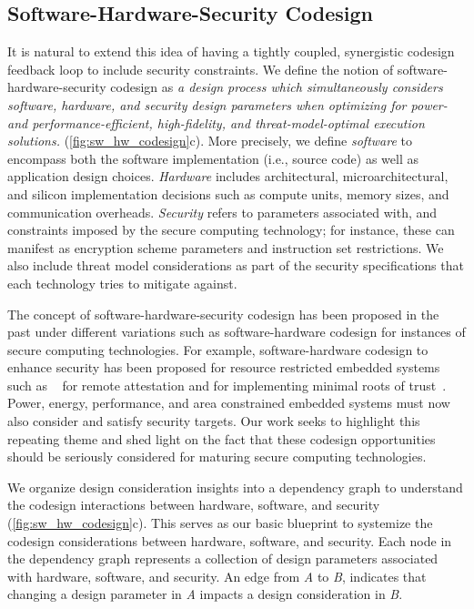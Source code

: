 \subsection{Software-Hardware-Security Codesign}

It is natural to extend this idea of having a tightly coupled, synergistic codesign feedback loop to include security constraints.
We define the notion of software-hardware-security codesign as \emph{a design process which simultaneously considers software, hardware, and security design parameters when optimizing for power- and performance-efficient, high-fidelity, and threat-model-optimal execution solutions.} (\autoref{fig:sw_hw_codesign}c).
More precisely, we define \textit{software} to encompass both the software implementation (i.e., source code) as well as application design choices.
\textit{Hardware} includes architectural, microarchitectural, and silicon implementation decisions such as compute units, memory sizes, and communication overheads.
\textit{Security} refers to parameters associated with, and constraints imposed by the secure computing technology; for instance, these can manifest as encryption scheme parameters and instruction set restrictions.
We also include threat model considerations as part of the security specifications that each technology tries to mitigate against.

The concept of software-hardware-security codesign has been proposed in the past under different variations such as software-hardware codesign for instances of secure computing technologies.
For example, software-hardware codesign to enhance security has been proposed for resource restricted embedded systems such as ~\cite{vrased} for remote attestation and for implementing minimal roots of trust~\cite{eldefrawy2012smart}.
Power, energy, performance, and area constrained embedded systems must now also consider and satisfy security targets.
Our work seeks to highlight this repeating theme and shed light on the fact that these codesign opportunities should be seriously considered for maturing secure computing technologies.

We organize design consideration insights into a dependency graph to understand the codesign interactions between hardware, software, and security (\autoref{fig:sw_hw_codesign}c).
This serves as our basic blueprint to systemize the codesign considerations between hardware, software, and security.
Each node in the dependency graph represents a collection of design parameters associated with hardware, software, and security.
An edge from \textit{A} to \textit{B}, indicates that changing a design parameter in \textit{A} impacts a design consideration in \textit{B}.

